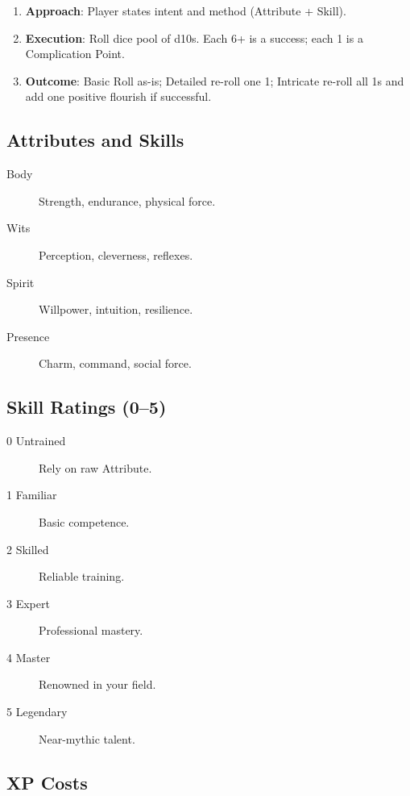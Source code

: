 \begin{enumerate}
\item \textbf{Approach}: Player states intent and method (Attribute + Skill).
\item \textbf{Execution}: Roll dice pool of d10s. Each 6+ is a success; each 1 is a Complication Point.
\item \textbf{Outcome}: Basic Roll as-is; Detailed re-roll one 1; Intricate re-roll all 1s and add one positive flourish if successful.
\end{enumerate}

\subsection{Attributes and Skills}

\begin{description}
\item[Body] Strength, endurance, physical force.
\item[Wits] Perception, cleverness, reflexes.
\item[Spirit] Willpower, intuition, resilience.
\item[Presence] Charm, command, social force.
\end{description}

\subsection{Skill Ratings (0--5)}

\begin{description}
\item[0 Untrained] Rely on raw Attribute.
\item[1 Familiar] Basic competence.
\item[2 Skilled] Reliable training.
\item[3 Expert] Professional mastery.
\item[4 Master] Renowned in your field.
\item[5 Legendary] Near-mythic talent.
\end{description}

\subsection{XP Costs}

